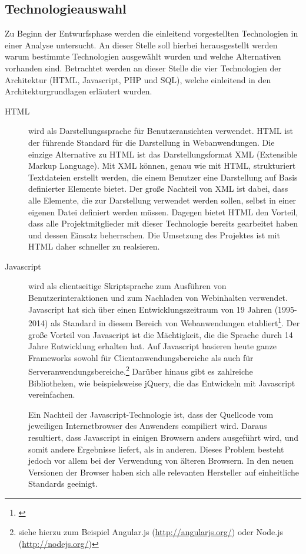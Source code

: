 \subsection{Technologieauswahl}
\label{sec:Technologieauswahl}

Zu Beginn der Entwurfsphase werden die einleitend vorgestellten Technologien in
einer Analyse untersucht. An dieser Stelle soll hierbei herausgestellt werden
warum bestimmte Technologien ausgewählt wurden und welche Alternativen vorhanden
sind. Betrachtet werden an dieser Stelle die vier Technologien der Architektur
(HTML, Javascript, PHP und SQL), welche einleitend in den Architekturgrundlagen
erläutert wurden.

\begin{description}
  \item[HTML] wird als Darstellungssprache für Benutzeransichten verwendet.
  HTML ist der führende Standard für die Darstellung in Webanwendungen. Die
  einzige Alternative zu HTML ist das Darstellungsformat XML (Extensible Markup
  Language). Mit XML können, genau wie mit HTML, strukturiert Textdateien
  erstellt werden, die einem Benutzer eine Darstellung auf Basis definierter
  Elemente bietet. Der große Nachteil von XML ist dabei, dass alle Elemente,
  die zur Darstellung verwendet werden sollen, selbst in einer eigenen Datei
  definiert werden müssen. Dagegen bietet HTML den Vorteil, dass alle  
  Projektmitglieder mit dieser Technologie bereits gearbeitet haben und dessen
  Einsatz beherrschen. Die Umsetzung des Projektes ist mit HTML daher
  schneller zu realsieren.
  \item[Javascript] wird als clientseitige Skriptsprache zum Ausführen von
  Benutzerinteraktionen und zum Nachladen von Webinhalten verwendet. Javascript
  hat sich über einen Entwicklungszeitraum von 19 Jahren (1995-2014) als
  Standard in diesem Bereich von Webanwendungen  
  etabliert\footnote{\citet[S.~2]{powers2007}}. Der große Vorteil von Javascript
  ist die Mächtigkeit, die die Sprache durch 14 Jahre Entwicklung erhalten hat.
  Auf Javascript basieren heute ganze Frameworks sowohl für
  Clientanwendungsbereiche als auch für Serveranwendungsbereiche.\footnote{siehe
  hierzu zum Beispiel Angular.js (\url{http://angularjs.org/}) oder Node.js
  (\url{http://nodejs.org/})} Darüber hinaus gibt es zahlreiche Bibliotheken,
  wie beispielsweise jQuery, die das Entwickeln mit Javascript vereinfachen. 
  
  Ein Nachteil der Javascript-Technologie ist, dass der Quellcode vom jeweiligen
  Internetbrowser des Anwenders compiliert wird. Daraus resultiert, dass
  Javascript in einigen Browsern anders ausgeführt wird, und somit andere
  Ergebnisse liefert, als in anderen. Dieses Problem besteht jedoch vor allem
  bei der Verwendung von älteren Browsern. In den neuen Versionen der
  Browser haben sich alle relevanten Hersteller auf einheitliche Standards
  geeinigt. 
  

\end{description}
